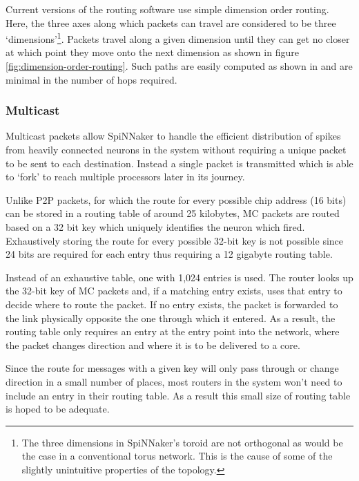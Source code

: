 				Current versions of the routing software use simple dimension order
				routing. Here, the three axes along which packets can travel are
				considered to be three `dimensions'\footnote{The three dimensions in
				SpiNNaker's toroid are not orthogonal as would be the case in a
				conventional torus network. This is the cause of some of the slightly
				unintuitive properties of the topology.}. Packets travel along a given
				dimension until they can get no closer at which point they move onto the
				next dimension as shown in figure \ref{fig:dimension-order-routing}.
				Such paths are easily computed as shown in \cite{nocetti02} and are
				minimal in the number of hops required.
			
			\subsubsection{Multicast}
				
				
				Multicast packets allow SpiNNaker to handle the efficient distribution
				of spikes from heavily connected neurons in the system without requiring
				a unique packet to be sent to each destination. Instead a single packet
				is transmitted which is able to `fork' to reach multiple processors
				later in its journey.
				
				Unlike P2P packets, for which the route for every possible chip address
				(16 bits) can be stored in a routing table of around 25 kilobytes, MC
				packets are routed based on a 32 bit key which uniquely identifies the
				neuron which fired.  Exhaustively storing the route for every possible
				32-bit key is not possible since 24 bits are required for each entry
				thus requiring a 12 gigabyte routing table.
				
				Instead of an exhaustive table, one with 1,024 entries is used. The
				router looks up the 32-bit key of MC packets and, if a matching entry
				exists, uses that entry to decide where to route the packet. If no entry
				exists, the packet is forwarded to the link physically opposite the one
				through which it entered. As a result, the routing table only requires
				an entry at the entry point into the network, where the packet changes
				direction and where it is to be delivered to a core.
				
				Since the route for messages with a given key will only pass through or
				change direction in a small number of places, most routers in the system
				won't need to include an entry in their routing table. As a result this
				small size of routing table is hoped to be adequate.
				
